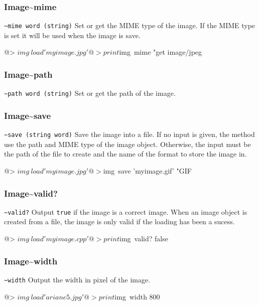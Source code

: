\subsubsection*{Image\textasciitilde mime} 

{\tt \verb+~+mime word (string)}  
\newline\newline
Set or get the MIME type of the image. If the MIME type is set it will be used when the image is save.
\begin{verbatimtab}
@> $img~load 'myimage.jpg'
@> print $img~mime "get
image/jpeg 
\end{verbatimtab}

\subsubsection*{Image\textasciitilde path} 

{\tt \verb+~+path word (string)}  
\newline\newline
Set or get the path of the image.

\subsubsection*{Image\textasciitilde save} 

{\tt \verb+~+save (string word)}  
\newline\newline
Save the image into a file. If no input is given, the method use the path and MIME type of the image object. Otherwise, the input must be the path of the file to create and the name of the format to store the image in.
\begin{verbatimtab}
@> $img~load 'myimage.jpg'
@> $img~save 'myimage.gif' "GIF
\end{verbatimtab}

\subsubsection*{Image\textasciitilde valid?} 

{\tt \verb+~+valid?}  
\newline\newline
Output {\tt true} if the image is a correct image. When an image object is created from a file, the image is only valid if the loading has been a sucess. 
\begin{verbatimtab}
@> $img~load 'myimage.cpp'
@> print $img~valid?
false
\end{verbatimtab}

\subsubsection*{Image\textasciitilde width} 

{\tt \verb+~+width}  
\newline\newline
Output the width in pixel of the image. 
\begin{verbatimtab}
@> $img~load 'ariane5.jpg'
@> print $img~width
800
\end{verbatimtab}
\cbend
